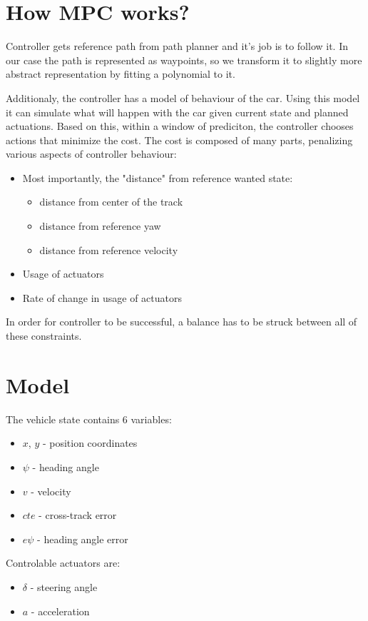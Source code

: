 \documentclass[12pt]{article}
\begin{document}
\section{How MPC works?}

Controller gets reference path from path planner and it's job is to follow it.
In our case the path is represented as waypoints, so we transform it to slightly
more abstract representation by fitting a polynomial to it.


Additionaly, the controller has a model of behaviour of the car. Using this
model it can simulate what will happen with the car given current state and planned
actuations. Based on this, within a window of prediciton, the controller chooses
actions that minimize the cost. The cost is composed of many parts, penalizing various
aspects of controller behaviour:
\begin{itemize}
    \item Most importantly, the "distance" from reference wanted state:
    \begin{itemize}
        \item distance from center of the track
        \item distance from reference yaw
        \item distance from reference velocity
    \end{itemize}
    \item Usage of actuators
    \item Rate of change in usage of actuators
\end{itemize}

In order for controller to be successful, a balance has to be struck between
all of these constraints.


\section{Model}

The vehicle state contains 6 variables:
\begin{itemize}
    \item $x$, $y$ -  position coordinates
    \item $\psi$ - heading angle
    \item $v$ - velocity
    \item $cte$ - cross-track error
    \item $e\psi$ - heading angle error
\end{itemize}


Controlable actuators are:
\begin{itemize}
    \item $\delta$ - steering angle
    \item $a$ - acceleration
\end{itemize}
\end{document}
